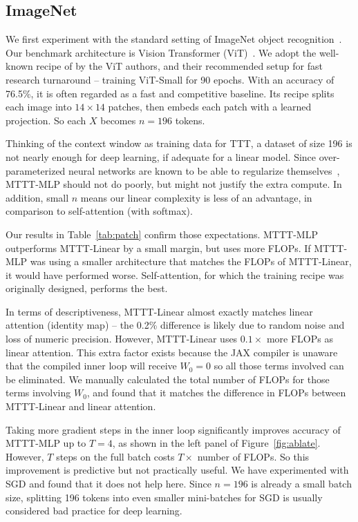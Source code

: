 \documentclass{article} %
\begin{document}
\subsection{ImageNet}
\label{subsec:patch}

We first experiment with the standard setting of ImageNet object recognition~\citep{deng2009imagenet}.
Our benchmark architecture is Vision Transformer (ViT)~\citep{dosovitskiy2020image}.
We adopt the well-known recipe of \cite{beyer2022better} by the ViT authors, and their recommended setup for fast research turnaround -- training ViT-Small for 90 epochs.
With an accuracy of 76.5\%, it is often regarded as a fast and competitive baseline.
Its recipe splits each image into $14\times 14$ patches, then embeds each patch with a learned projection. 
So each $X$ becomes $n=196$ tokens.

Thinking of the context window as training data for TTT, a dataset of size 196 is not nearly enough for deep learning, if adequate for a linear model. 
Since over-parameterized neural networks are known to be able to regularize themselves~\citep{zhang2021understanding}, 
MTTT-MLP should not do poorly, but might not justify the extra compute.
In addition, small $n$ means our linear complexity is less of an advantage, in comparison to self-attention (with softmax).

Our results in Table~\ref{tab:patch} confirm those expectations. 
MTTT-MLP outperforms MTTT-Linear by a small margin, but uses more FLOPs.
If MTTT-MLP was using a smaller architecture that matches the FLOPs of MTTT-Linear, it would have performed worse.
Self-attention, for which the training recipe was originally designed, performs the best.

In terms of descriptiveness, MTTT-Linear almost exactly matches linear attention (identity map) -- the 0.2\% difference is likely due to random noise and loss of numeric precision.
However, MTTT-Linear uses $0.1\times$ more FLOPs as linear attention.
This extra factor exists because the JAX compiler is unaware that the compiled inner loop will receive $W_0 = 0$ so all those terms involved can be eliminated. We manually calculated the total number of FLOPs for those terms involving $W_0$, and found that it matches the difference in FLOPs between MTTT-Linear and linear attention.

Taking more gradient steps in the inner loop significantly improves accuracy of MTTT-MLP up to $T=4$, as shown in the left panel of Figure~\ref{fig:ablate}.
However, $T$ steps on the full batch costs $T\times$ number of FLOPs.
So this improvement is predictive but not practically useful.
We have experimented with SGD and found that it does not help here.
Since $n=196$ is already a small batch size, splitting 196 tokens into even smaller mini-batches for SGD is usually considered bad practice for deep learning.
\end{document}
